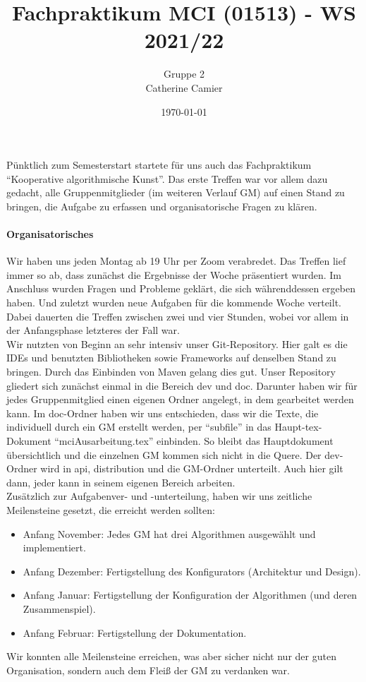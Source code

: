 \documentclass[../mciAusarbeitung.tex]{subfiles}
\title{Fachpraktikum MCI (01513) - WS 2021/22}
\author{Gruppe 2\\
	Catherine Camier}
\date{\today}
\begin{document}
Pünktlich zum Semesterstart startete für uns auch das Fachpraktikum "`Kooperative algorithmische Kunst"'. Das erste Treffen war vor allem dazu gedacht, alle Gruppenmitglieder (im weiteren Verlauf GM) auf einen Stand zu bringen, die Aufgabe zu erfassen und organisatorische Fragen zu klären.
		
\paragraph{Organisatorisches}
Wir haben uns jeden Montag ab 19 Uhr per Zoom verabredet. Das Treffen lief immer so ab, dass zunächst die Ergebnisse der Woche präsentiert wurden. Im Anschluss wurden Fragen und Probleme geklärt, die sich währenddessen ergeben haben. Und zuletzt wurden neue Aufgaben für die kommende Woche verteilt. Dabei dauerten die Treffen zwischen zwei und vier Stunden, wobei vor allem in der Anfangsphase letzteres der Fall war.\\
Wir nutzten von Beginn an sehr intensiv unser Git-Repository. Hier galt es die IDEs und benutzten Bibliotheken sowie Frameworks auf denselben Stand zu bringen. Durch das Einbinden von Maven gelang dies gut. Unser Repository gliedert sich zunächst einmal in die Bereich dev und doc. Darunter haben wir für jedes Gruppenmitglied einen eigenen Ordner angelegt, in dem gearbeitet werden kann. Im doc-Ordner haben wir uns entschieden, dass wir die Texte, die individuell durch ein GM erstellt werden, per "`subfile"' in das Haupt-tex-Dokument "`mciAusarbeitung.tex"' einbinden. So bleibt das Hauptdokument übersichtlich und die einzelnen GM kommen sich nicht in die Quere. Der dev-Ordner wird in api, distribution und die GM-Ordner unterteilt. Auch hier gilt dann, jeder kann in seinem eigenen Bereich arbeiten.\\
Zusätzlich zur Aufgabenver- und -unterteilung, haben wir uns zeitliche Meilensteine gesetzt, die erreicht werden sollten:
\begin{itemize}
	\item Anfang November: Jedes GM hat drei Algorithmen ausgewählt und implementiert.
	\item Anfang Dezember: Fertigstellung des Konfigurators (Architektur und Design).
	\item Anfang Januar: Fertigstellung der Konfiguration der Algorithmen (und deren Zusammenspiel).
	\item Anfang Februar: Fertigstellung der Dokumentation.
\end{itemize}
Wir konnten alle Meilensteine erreichen, was aber sicher nicht nur der guten Organisation, sondern auch dem Fleiß der GM zu verdanken war.
	
\end{document}
